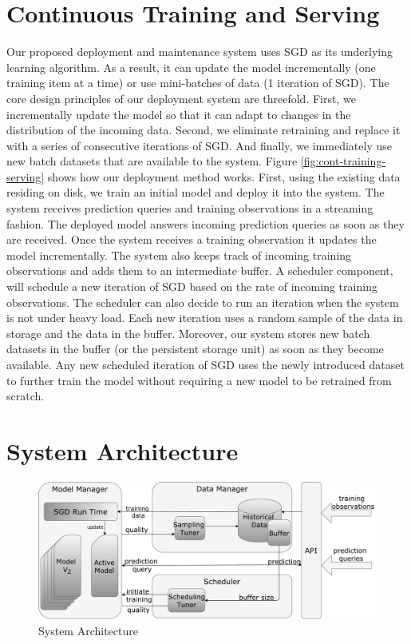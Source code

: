 \documentclass{vldb}
\begin{document}
\section{Continuous Training and Serving} \label{continious-training-serving}
Our proposed deployment and maintenance system uses SGD as its underlying learning algorithm.
As a result, it can update the model incrementally (one training item at a time) or use mini-batches of data (1 iteration of SGD).
The core design principles of our deployment system are threefold.
First, we incrementally update the model so that it can adapt to changes in the distribution of the incoming data.
Second, we eliminate retraining and replace it with a series of consecutive iterations of SGD.
And finally, we immediately use new batch datasets that are available to the system.
Figure \ref{fig:cont-training-serving} shows how our deployment method works.
First, using the existing data residing on disk, we train an initial model and deploy it into the system.
The system receives prediction queries and training observations in a streaming fashion.
The deployed model answers incoming prediction queries as soon as they are received.
Once the system receives a training observation it updates the model incrementally.
The system also keeps track of incoming training observations and adds them to an intermediate buffer.
A scheduler component, will schedule a new iteration of SGD based on the rate of incoming training observations. 
The scheduler can also decide to run an iteration when the system is not under heavy load.
Each new iteration uses a random sample of the data in storage and the data in the buffer. 
Moreover, our system stores new batch datasets in the buffer (or the persistent storage unit) as soon as they become available.
Any new scheduled iteration of SGD uses the newly introduced dataset to further train the model without requiring a new model to be retrained from scratch.

\section{System Architecture} \label{sec:system-architecutre}
\begin{figure}[t]
\centering
\includegraphics[width=\columnwidth]{../images/system-architecture-final.pdf}
\caption{System Architecture}
\label{fig:system-architecture}
\end{figure}
\end{document}
